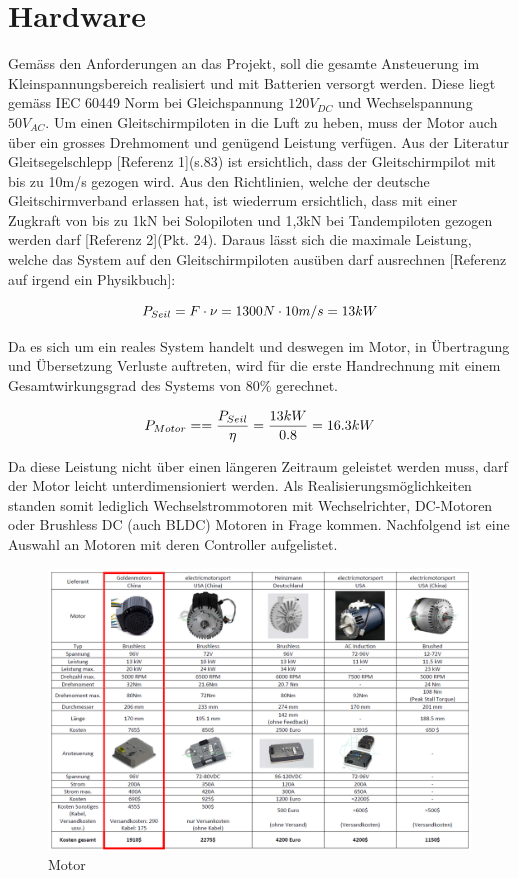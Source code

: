 \section{Hardware}

Gemäss den Anforderungen an das Projekt, soll die gesamte Ansteuerung im Kleinspannungsbereich realisiert und mit Batterien versorgt werden. Diese liegt gemäss IEC 60449 Norm bei Gleichspannung $120V_{DC}$ und Wechselspannung $50V_{AC}$. Um einen Gleitschirmpiloten in die Luft zu heben, muss der Motor auch über ein grosses Drehmoment und genügend Leistung verfügen. Aus der Literatur Gleitsegelschlepp [Referenz 1](s.83) ist ersichtlich, dass der Gleitschirmpilot mit bis zu 10m/s gezogen wird. Aus den Richtlinien, welche der deutsche Gleitschirmverband erlassen hat, ist wiederrum ersichtlich, dass mit einer Zugkraft von bis zu 1kN bei Solopiloten und 1,3kN bei Tandempiloten gezogen werden darf [Referenz 2](Pkt. 24). Daraus lässt sich die maximale Leistung, welche das System auf den Gleitschirmpiloten ausüben darf ausrechnen [Referenz auf irgend ein Physikbuch]:


\begin{equation}
\centering
P_{Seil}=F \cdot \nu=1300N \cdot 10m/s=13kW
\label{eq:LeistungSeil}
\end{equation}

Da es sich um ein reales System handelt und deswegen im Motor, in Übertragung und Übersetzung Verluste auftreten, wird für die erste Handrechnung mit einem Gesamtwirkungsgrad des Systems von 80$\%$ gerechnet.

\begin{equation}
\centering
P_{Motor}==\frac{P_{Seil}}{\eta}=\frac{13kW}{0.8}=16.3kW
\label{eq:LeistungMotor}
\end{equation}

Da diese Leistung nicht über einen längeren Zeitraum geleistet werden muss, darf der Motor leicht unterdimensioniert werden. Als Realisierungsmöglichkeiten standen somit lediglich Wechselstrommotoren mit Wechselrichter, DC-Motoren oder Brushless DC (auch BLDC) Motoren in Frage kommen. Nachfolgend ist eine Auswahl an Motoren mit deren Controller aufgelistet.

\begin{figure}[H]
	\begin{center}
		\includegraphics[width=120mm]{graphics/motor.png}
		\caption[Motorenvergleich]{Motor} %
		\label{fig:Funktion Dojo}
	\end{center}
\end{figure}